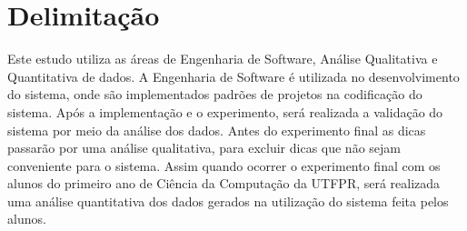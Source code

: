\chapter{Delimitação}

Este estudo utiliza as áreas de Engenharia de Software, Análise Qualitativa e Quantitativa de dados. A Engenharia de Software é utilizada no desenvolvimento do sistema, onde são implementados padrões de projetos na codificação do sistema. Após a implementação e o experimento, será realizada a validação do sistema por meio da análise dos dados. Antes do experimento final as dicas passarão por uma análise qualitativa, para excluir dicas que não sejam conveniente para o sistema. Assim quando ocorrer o experimento final com os alunos do primeiro ano de Ciência da Computação da UTFPR, será realizada uma análise quantitativa dos dados gerados na utilização do sistema feita pelos alunos. 